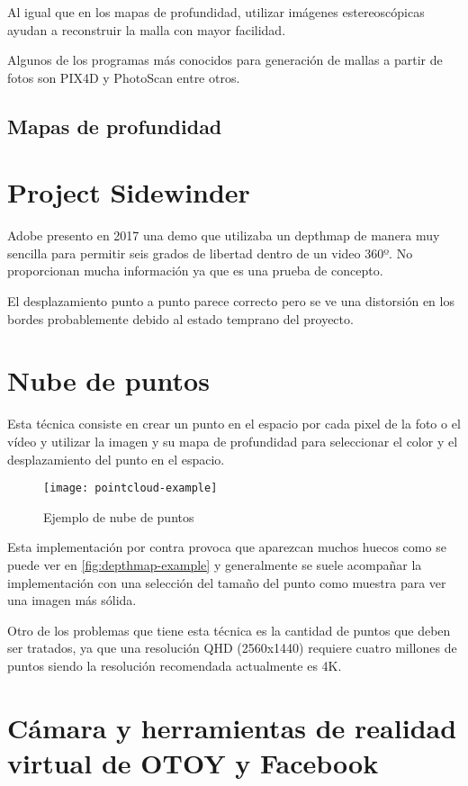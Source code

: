 Al igual que en los mapas de profundidad, utilizar imágenes estereoscópicas ayudan a reconstruir la malla con mayor facilidad.

Algunos de los programas más conocidos para generación de mallas a partir de fotos son PIX4D y PhotoScan entre otros.

\subsection{Mapas de profundidad}


\section{Project Sidewinder}
Adobe presento en 2017 \cite{SidewinderAdobe} una demo que utilizaba un depthmap de manera muy sencilla para permitir seis grados de libertad dentro de un video 360º. No proporcionan mucha información ya que es una prueba de concepto.

El desplazamiento punto a punto parece correcto pero se ve una distorsión en los bordes probablemente debido al estado temprano del proyecto.

\section{Nube de puntos}
Esta técnica consiste en crear un punto en el espacio por cada pixel de la foto o el vídeo y utilizar la imagen y su mapa de profundidad para seleccionar el color y el desplazamiento del punto en el espacio. \cite{UploadVR} %

\begin{figure}[h]
  \centering
  \texttt{[image: pointcloud-example]}
  \caption{Ejemplo de nube de puntos}
  \label{fig:pointcloud-example}
\end{figure}

Esta implementación por contra provoca que aparezcan muchos huecos como se puede ver en \ref{fig:depthmap-example} y generalmente se suele acompañar la implementación con una selección del tamaño del punto como muestra \cite{Josh6DoFUnity} para ver una imagen más sólida.

Otro de los problemas que tiene esta técnica es la cantidad de puntos que deben ser tratados, ya que una resolución QHD (2560x1440) requiere cuatro millones de puntos siendo la resolución recomendada actualmente es 4K.

\section{Cámara y herramientas de realidad virtual de OTOY y Facebook}

